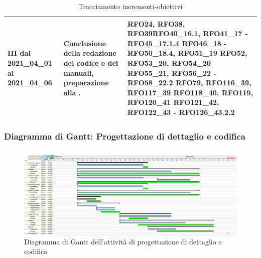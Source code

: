 \begin{table}[H]
\begin{center}
\begin{tabular}{ |C{3cm} C{6cm} C{7cm}| }
			III dal 2021\_04\_01 al 2021\_04\_06 	& 
			Conclusione della redazione del codice e dei manuali, preparazione alla . & RFO24, RFO38, RFO39\newline RFO40\_16.1,
			RFO41\_17 - RFO45\_17.1.4\newline
			RFO46\_18 - RFO50\_18.4, RFO51\_19 \newline
			RFO52, RFO53\_20, RFO54\_20 \newline
			RFO55\_21, RFO56\_22 - RFO58\_22.2 \newline
			RFO79, RFO116\_39, RFO117\_39 \newline RFO118\_40, RFO119, RFO120\_41 \newline
			RFO121\_42, RFO122\_43 - RFO126\_43.2.2 \\ \hline
		\end{tabular}
		\caption{Tracciamento incrementi-obiettivi}
	\end{center}
\end{table}

\newpage
\subsubsection{Diagramma di Gantt: Progettazione di dettaglio e codifica} \label{GanttPDettaglio}
\begin{figure}[ht]
    \centering
    \includegraphics[width=\textwidth]{Immagini/GanttProgettazioneDiDettaglioECodifica}
    \caption{Diagramma di Gantt dell'attività di progettazione di dettaglio e codifica}
\end{figure}